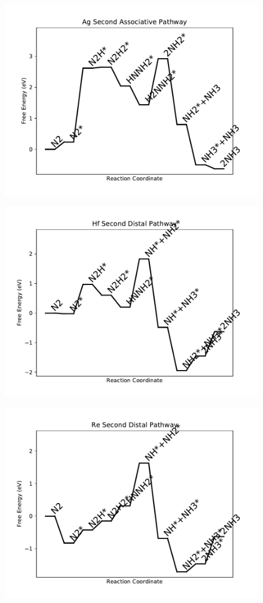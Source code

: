 \begin{figure}
\includegraphics[width=0.8\linewidth]{data/plots/Ag_associative_2.pdf}
\end{figure}

\begin{figure}
\includegraphics[width=0.8\linewidth]{data/plots/Hf_distal_2.pdf}
\end{figure}

\begin{figure}
\includegraphics[width=0.8\linewidth]{data/plots/Re_distal_2.pdf}
\end{figure}

